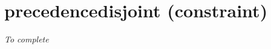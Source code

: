 \section{precedencedisjoint (constraint)}\label{precedencedisjoint:precedencedisjointconstraint}\hypertarget{precedencedisjoint:precedencedisjointconstraint}{}
\emph{To complete}
